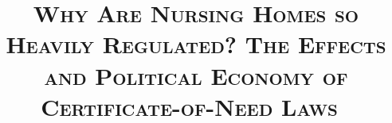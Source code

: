 \documentclass[12pt]{article}
\begin{document}

\title{\textsc{Why Are Nursing Homes so Heavily Regulated? The Effects and Political Economy of Certificate-of-Need Laws}%
	$~$\\}

\medskip


\date{}              %





\renewcommand{\thefootnote}{\fnsymbol{footnote}}

\singlespacing

\maketitle
\end{document}
